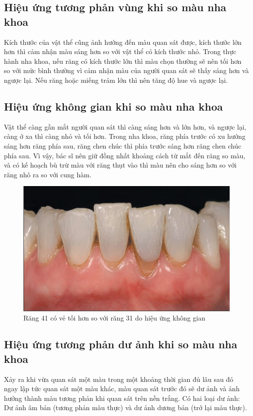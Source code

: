 \subsection{Hiệu ứng tương phản vùng khi so màu nha khoa}
\qquad Kích thước của vật thể cũng ảnh hưởng đến màu quan sát được, kích thước lớn hơn thì cảm nhận màu sáng hơn so với vật thể có kích thước nhỏ. Trong thực hành nha khoa, nếu răng có kích thước lớn thì màu chọn thường sẽ nên tối hơn so với mức bình thường vì cảm nhận màu của người quan sát sẽ thấy sáng hơn và ngược lại. Nếu răng hoặc miếng trám lớn thì nên tăng độ hue và ngược lại.\cite{TruongDinhKhoi}

\subsection{Hiệu ứng không gian khi so màu nha khoa}
\qquad Vật thể càng gần mắt người quan sát thì càng sáng hơn và lớn hơn, và ngược lại, càng ở xa thì càng nhỏ và tối hơn. Trong nha khoa, răng phía trước có xu hướng sáng hơn răng phía sau, răng chen chúc thì phía trước sáng hơn răng chen chúc phía sau. Vì vậy, bác sĩ nên giữ đồng nhất khoảng cách từ mắt đến răng so màu, và có kế hoạch bù trừ màu với răng thụt vào thì màu nên cho sáng hơn so với răng nhô ra so với cung hàm.\cite{TruongDinhKhoi}

\begin{figure}[h]
\centering
    \includegraphics[width=0.7\columnwidth]{pictures/không gian so màu.jpeg}
    \caption{Răng 41 có vẻ tối hơn so với răng 31 do hiệu ứng không gian}
    \label{fig:không gian so màu}
\end{figure}

\subsection{Hiệu ứng tương phản dư ảnh khi so màu nha khoa}
\qquad Xảy ra khi vừa quan sát một màu trong một khoảng thời gian đủ lâu sau đó ngay lập tức quan sát một màu khác, màu quan sát trước đó sẽ dư ảnh và ảnh hưởng thành màu tương phản khi quan sát trên nền trắng. Có hai loại dư ảnh: Dư ảnh âm bản (tương phản màu thực) và dư ảnh dương bản (trở lại màu thực).\cite{TruongDinhKhoi}


